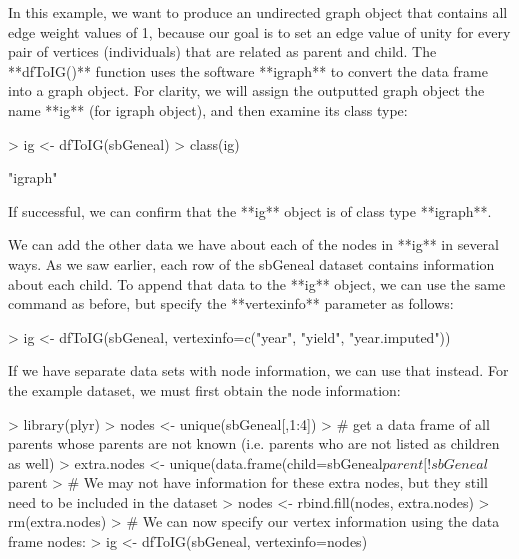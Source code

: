 \documentclass{article}
\numberwithin{equation}{section} %
\begin{document}
In this example, we want to produce an undirected graph object that contains all edge weight values of 1, because our goal is to set an edge value of unity for every pair of vertices (individuals) that are related as parent and child. The **dfToIG()** function uses the software **igraph** to convert the data frame into a graph object. For clarity, we will assign the outputted graph object the name **ig** (for igraph object), and then examine its class type:

\begin{Schunk}
\begin{Sinput}
> ig <- dfToIG(sbGeneal)
> class(ig)
\end{Sinput}
\begin{Soutput}
[1] "igraph"
\end{Soutput}
\end{Schunk}

If successful, we can confirm that the **ig** object is of class type **igraph**.

We can add the other data we have about each of the nodes in **ig** in several ways. As we saw earlier, each row of the sbGeneal dataset contains information about each child. To append that data to the **ig** object, we can use the same command as before, but specify the **vertexinfo** parameter as follows: 

\begin{Schunk}
\begin{Sinput}
> ig <- dfToIG(sbGeneal, vertexinfo=c("year", "yield", "year.imputed"))
\end{Sinput}
\end{Schunk}

If we have separate data sets with node information, we can use that instead. For the example dataset, we must first obtain the node information: 

\begin{Schunk}
\begin{Sinput}
> library(plyr)
> nodes <- unique(sbGeneal[,1:4])
> # get a data frame of all parents whose parents are not known (i.e. parents who are not listed as children as well)
> extra.nodes <- unique(data.frame(child=sbGeneal$parent[!sbGeneal$parent%
> # We may not have information for these extra nodes, but they still need to be included in the dataset
> nodes <- rbind.fill(nodes, extra.nodes)
> rm(extra.nodes)
> # We can now specify our vertex information using the data frame nodes: 
> ig <- dfToIG(sbGeneal, vertexinfo=nodes)
\end{Sinput}
\end{Schunk}
\end{document}
